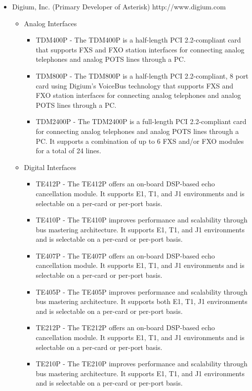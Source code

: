 \begin{itemize}
\item Digium, Inc. (Primary Developer of Asterisk)
      http://www.digium.com
  \begin{itemize}
     \item Analog Interfaces
     \begin{itemize}
       \item TDM400P - The TDM400P is a half-length PCI 2.2-compliant card that supports FXS and FXO station interfaces for connecting analog telephones and analog POTS lines through a PC.
       \item TDM800P - The TDM800P is a half-length PCI 2.2-compliant, 8 port card using Digium's VoiceBus technology that supports FXS and FXO station interfaces for connecting analog telephones and analog POTS lines through a PC.
       \item TDM2400P - The TDM2400P is a full-length PCI 2.2-compliant card for connecting analog telephones and analog POTS lines through a PC. It supports a combination of up to 6 FXS and/or FXO modules for a total of 24 lines.
     \end{itemize}
     \item Digital Interfaces
     \begin{itemize}
       \item TE412P - The TE412P offers an on-board DSP-based echo cancellation module. It supports E1, T1, and J1 environments and is selectable on a per-card or per-port basis.
       \item TE410P - The TE410P improves performance and scalability through bus mastering architecture. It supports E1, T1, and J1 environments and is selectable on a per-card or per-port basis.
       \item TE407P - The TE407P offers an on-board DSP-based echo cancellation module. It supports E1, T1, and J1 environments and is selectable on a per-card or per-port basis.
       \item TE405P - The TE405P improves performance and scalability through bus mastering architecture. It supports both E1, T1, J1 environments and is selectable on a per-card or per-port basis.
       \item TE212P - The TE212P offers an on-board DSP-based echo cancellation module. It supports E1, T1, and J1 environments and is selectable on a per-card or per-port basis.
       \item TE210P - The TE210P improves performance and scalability through bus mastering architecture. It supports E1, T1, and J1 environments and is selectable on a per-card or per-port basis.

\end{itemize}
\end{itemize}
\end{itemize}
